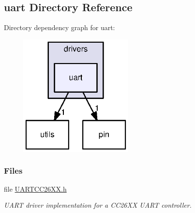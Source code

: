 \subsection{uart Directory Reference}
\label{dir_1d15878f1b451f7ae715c27b03949c4a}
Directory dependency graph for uart\+:
\nopagebreak
\begin{figure}[H]
\begin{center}
\leavevmode
\includegraphics[width=163pt]{dir_1d15878f1b451f7ae715c27b03949c4a_dep}
\end{center}
\end{figure}
\subsubsection*{Files}
\begin{DoxyCompactItemize}
\item 
file \hyperlink{_u_a_r_t_c_c26_x_x_8h}{U\+A\+R\+T\+C\+C26\+X\+X.\+h}
\begin{DoxyCompactList}\small\item\em U\+A\+R\+T driver implementation for a C\+C26\+X\+X U\+A\+R\+T controller. \end{DoxyCompactList}\end{DoxyCompactItemize}
